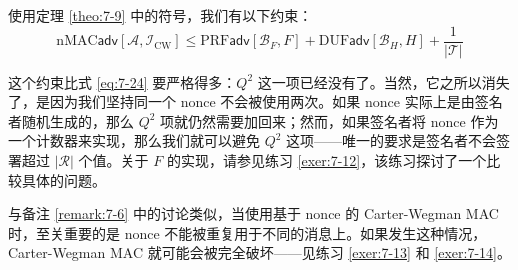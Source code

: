 \begin{theorem}\label{theo:7-10}
使用定理 \ref{theo:7-9} 中的符号，我们有以下约束：
\[
\mathrm{nMAC}\mathsf{adv}[\mathcal{A},\mathcal{I}_\mathrm{CW}]\leq\mathrm{PRF}\mathsf{adv}[\mathcal{B}_F,F]+\mathrm{DUF}\mathsf{adv}[\mathcal{B}_H,H]+\frac{1}{|\mathcal{T}|}
\]
\end{theorem}

这个约束比式 \ref{eq:7-24} 要严格得多：$Q^2$ 这一项已经没有了。当然，它之所以消失了，是因为我们坚持同一个 nonce 不会被使用两次。如果 nonce 实际上是由签名者随机生成的，那么 $Q^2$ 项就仍然需要加回来；然而，如果签名者将 nonce 作为一个计数器来实现，那么我们就可以避免 $Q^2$ 这项——唯一的要求是签名者不会签署超过 $|\mathcal{R}|$ 个值。关于 $F$ 的实现，请参见练习 \ref{exer:7-12}，该练习探讨了一个比较具体的问题。

与备注 \ref{remark:7-6} 中的讨论类似，当使用基于 nonce 的 Carter-Wegman MAC 时，至关重要的是 nonce 不能被重复用于不同的消息上。如果发生这种情况，Carter-Wegman MAC 就可能会被完全破坏——见练习 \ref{exer:7-13} 和 \ref{exer:7-14}。